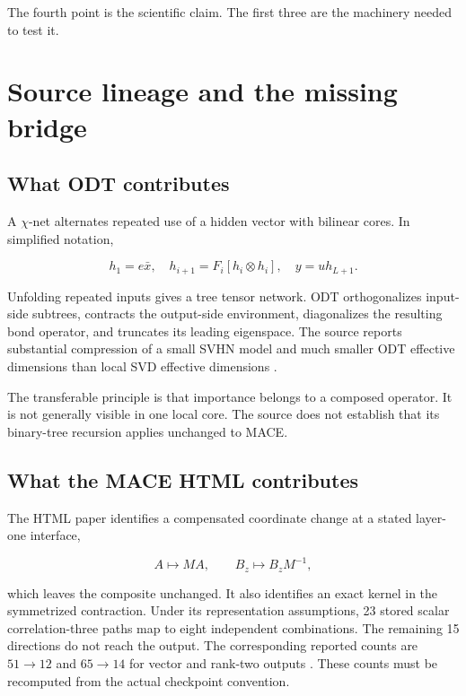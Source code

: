 \documentclass[10pt,twocolumn]{article}
\begin{document}
The fourth point is the scientific claim. The first three are the machinery needed to test it.

\section{Source lineage and the missing bridge}

\subsection{What ODT contributes}

A $\chi$-net alternates repeated use of a hidden vector with bilinear cores. In simplified notation,

\begin{equation}
h_1=e\bar x,
\quad
h_{i+1}=F_i[h_i\otimes h_i],
\quad
y=uh_{L+1}.
\label{eq:chinet}
\end{equation}

Unfolding repeated inputs gives a tree tensor network. ODT orthogonalizes input-side subtrees, contracts the output-side environment, diagonalizes the resulting bond operator, and truncates its leading eigenspace. The source reports substantial compression of a small SVHN model and much smaller ODT effective dimensions than local SVD effective dimensions \citep{dooms2025compositionality}.

The transferable principle is that importance belongs to a composed operator. It is not generally visible in one local core. The source does not establish that its binary-tree recursion applies unchanged to MACE.

\subsection{What the MACE HTML contributes}

The HTML paper identifies a compensated coordinate change at a stated layer-one interface,

\begin{equation}
A\mapsto MA,
\qquad
B_z\mapsto B_zM^{-1},
\label{eq:gauge}
\end{equation}

which leaves the composite unchanged. It also identifies an exact kernel in the symmetrized contraction. Under its representation assumptions, 23 stored scalar correlation-three paths map to eight independent combinations. The remaining 15 directions do not reach the output. The corresponding reported counts are $51\to12$ and $65\to14$ for vector and rank-two outputs \citep{olloqui2026inside}. These counts must be recomputed from the actual checkpoint convention.
\end{document}
